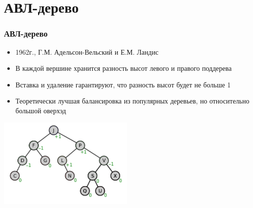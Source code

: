 \documentclass{../../slides-style}
\begin{document}
    \section{АВЛ-дерево}

    \begin{frame}
        \frametitle{АВЛ-дерево}
        \begin{itemize}
            \item 1962г., Г.М. Адельсон-Вельский и Е.М. Ландис
            \item В каждой вершине хранится разность высот левого и правого поддерева
            \item Вставка и удаление гарантируют, что разность высот будет не больше 1
            \item Теоретически лучшая балансировка из популярных деревьев, но относительно большой оверхэд
        \end{itemize}
        \begin{center}
            \includegraphics[width=0.5\textwidth]{avl-tree.png}
        \end{center}
    \end{frame}
\end{document}

